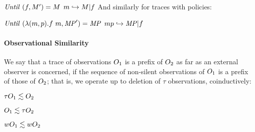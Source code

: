 \documentclass[acmsmall,review,anonymous]{acmart}\settopmatter{printfolios=true,printccs=false,printacmref=false}
\begin{document}
            {\(\mathit{Until}~(f,M')
              = M\)}
            {\(m \hookrightarrow M | f\)}
\noindent
And similarly for traces with policies:

            {\(\mathit{Until}~(\lambda (m,p).f\ m,\mathit{MP}') = \mathit{MP}\)}
         {\(mp \hookrightarrow \mathit{MP} | f\)}


\paragraph*{Observational Similarity}

We say that a trace of observations $O_1$ is a prefix of $O_2$
as far as an external observer is concerned, if the sequence of
non-silent observations of $O_1$ is a prefix of those of
$O_2$; that is, we operate up to deletion of \(\tau\) observations,
coinductively:

\begin{minipage}{.3\textwidth}
  \judgment{}{\(\obsT \lesssim \obsT\)}
\end{minipage}
\begin{minipage}{.3\textwidth}
\judgment{}{\(\tau \lesssim \obsT\)}
\end{minipage}
\begin{minipage}{.3\textwidth}
\end{minipage}

\begin{minipage}{.3\textwidth}
         {\(\tau O_1 \lesssim O_2\)}
\end{minipage}
\begin{minipage}{.3\textwidth}
         {\(O_1 \lesssim \tau O_2\)}
\end{minipage}
\begin{minipage}{.3\textwidth}
         {\(wO_1 \lesssim wO_2\)}
\end{minipage}
\end{document}
